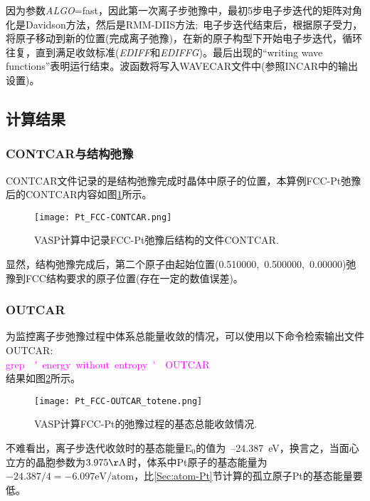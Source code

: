 因为参数\textit{ALGO}=\textrm{fast}，因此第一次离子步弛豫中，最初5步电子步迭代的矩阵对角化是\textrm{Davidson}方法，然后是\textrm{RMM-DIIS}方法;~电子步迭代结束后，根据原子受力，将原子移动到新的位置(完成离子弛豫)，在新的原子构型下开始电子步迭代，循环往复，直到满足收敛标准(\textit{EDIFF}和\textit{EDIFFG})。最后出现的\textrm{``writing wave functions''}表明运行结束。波函数将写入\textrm{WAVECAR}文件中(参照\textrm{INCAR}中的输出设置)。
\subsection{计算结果}
\subsubsection{\rm{CONTCAR}与结构弛豫}
\textrm{CONTCAR}文件记录的是结构弛豫完成时晶体中原子的位置，本算例\textrm{FCC-Pt}弛豫后的\textrm{CONTCAR}内容如图\ref{Pt_FCC:CONTCAR}所示。
\begin{figure}[h!]
\centering
\texttt{[image: Pt\_FCC-CONTCAR.png]}
\caption{\small \textrm{VASP}计算中记录\textrm{FCC-Pt}弛豫后结构的文件\textrm{CONTCAR}.}%
\label{Pt_FCC:CONTCAR}
\end{figure}

显然，结构弛豫完成后，第二个原子由起始位置\textrm{(0.510000,~0.500000,~0.00000)}弛豫到\textrm{FCC}结构要求的原子位置(存在一定的数值误差)。
\subsubsection{\rm{OUTCAR}}
为监控离子步弛豫过程中体系总能量收敛的情况，可以使用以下命令检索输出文件\textrm{OUTCAR}:\\
\textcolor{magenta}{\textrm{grep~~\'~energy~without~entropy~\'~~OUTCAR}}\\
结果如图\ref{Pt_FCC:OUTCAR_totene}所示。
\begin{figure}[h!]
\centering
\texttt{[image: Pt\_FCC-OUTCAR\_totene.png]}
\caption{\small \textrm{VASP}计算\textrm{FCC-Pt}的弛豫过程的基态总能收敛情况.}%
\label{Pt_FCC:OUTCAR_totene}
\end{figure}

不难看出，离子步迭代收敛时的基态能量$\mathrm{E}_0$的值为~--24.387\textrm{~eV}，换言之，当面心立方的晶胞参数为$3.975\mathrm{\AA}$时，体系中\textrm{Pt}原子的基态能量为$-24.387/4=-6.097\mathrm{eV/atom}$，比\ref{Sec:atom-Pt}节计算的孤立原子\textrm{Pt}的基态能量要低。

